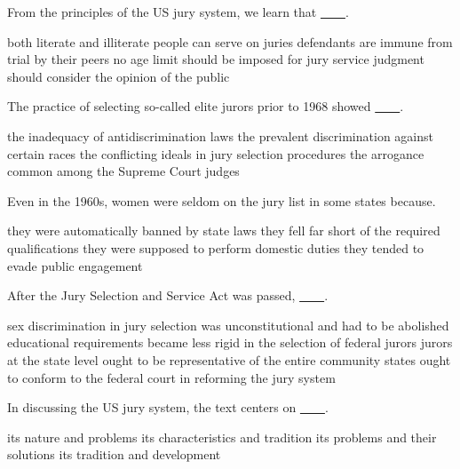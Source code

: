 \item From the principles of the US jury system, we learn that \uline{~~~~}.
\begin{tasks}
	\task both literate and illiterate people can serve on juries
	\task defendants are immune from trial by their peers
	\task no age limit should be imposed for jury service
	\task judgment should consider the opinion of the public
\end{tasks}
\item The practice of selecting so-called elite jurors prior to 1968 showed \uline{~~~~}.
\begin{tasks}
	\task the inadequacy of antidiscrimination laws
	\task the prevalent discrimination against certain races
	\task the conflicting ideals in jury selection procedures
	\task the arrogance common among the Supreme Court judges
\end{tasks}
\item Even in the 1960s, women were seldom on the jury list in some states because.
\begin{tasks}
	\task they were automatically banned by state laws
	\task they fell far short of the required qualifications
	\task they were supposed to perform domestic duties
	\task they tended to evade public engagement
\end{tasks}
\item After the Jury Selection and Service Act was passed, \uline{~~~~}.
\begin{tasks}
	\task sex discrimination in jury selection was unconstitutional and had to be abolished
	\task educational requirements became less rigid in the selection of federal jurors
	\task jurors at the state level ought to be representative of the entire community
	\task states ought to conform to the federal court in reforming the jury system
\end{tasks}
\item In discussing the US jury system, the text centers on \uline{~~~~}.
\begin{tasks}
	\task its nature and problems
	\task its characteristics and tradition
	\task its problems and their solutions
	\task its tradition and development
\end{tasks}
